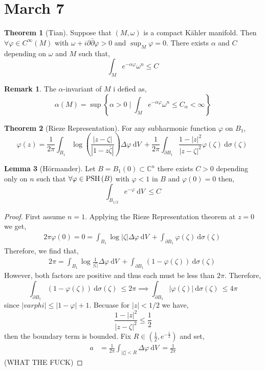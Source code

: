 \documentclass[12pt]{extarticle}
\newcommand{\C}{\mathbb{C}}
\renewcommand{\d}[1]{\: \mathrm{d}#1 \:}
\theoremstyle{definition}
\newtheorem{theorem}{Theorem}[section]
\newtheorem{lemma}[theorem]{Lemma}
\newtheorem{remark}{Remark}
\begin{document}
\section{March 7}

\begin{theorem}[Tian]
Suppose that $(M, \omega)$ is a compact K\"{a}hler manifold. Then $\forall \varphi \in C^{\infty}(M)$ with $\omega + i \partial \bar{\partial} \varphi > 0 $ and $\sup_M{\varphi} = 0$. There exists $\alpha$ and $C$ depending on $\omega$ and $M$ such that,
\[ \int_M e^{-\alpha \varphi} \omega^n \le C \]
\end{theorem}

\begin{remark}
The $\alpha$-invariant of $M$ i defied as,
\[ \alpha(M) = \sup \left\{ \alpha > 0 \mid \int_M e^{-\alpha \varphi} \omega^n \le C_\alpha < \infty \right\} \]
\end{remark}

\begin{theorem}[Rieze Representation]
For any subharmonic function $\varphi$ on $B_1$,
\[ \varphi(z) = \frac{1}{2 \pi} \int_{B_1} \log{\left( \frac{|z - \zeta|}{|1 - z \bar{\zeta}|}\right)} \Delta \varphi \d{V} + \frac{1}{2 \pi} \int_{\partial B_1} \frac{1 - |z|^2}{|z - \zeta|^2} \varphi(\zeta) \d{\sigma(\zeta)} \]
\end{theorem}

\begin{lemma}[H\"{o}rmander]
Let $B = B_1(0) \subset \C^n$ there exists $C > 0$ depending only on $n$ such that $\forall \varphi \in \mathrm{PSH}\left( B \right)$ with $\varphi < 1$ in $B$ and $\varphi(0) = 0$ then,
\[ \int_{B_{1/2}} e^{- \varphi} \d{V} \le C \]
\end{lemma}

\begin{proof}
First assume $n = 1$. Applying the Rieze Representation theorem at $z = 0$ we get,
\begin{align*}
2 \pi \varphi(0) = 0 = \int_{B_1} \log{|\zeta|} \Delta \varphi \d{V} + \int_{\partial B_1} \varphi(\zeta) \d{\sigma(\zeta)} 
\end{align*}
Therefore, we find that,
\begin{align*}
2 \pi  = \int_{B_1} \log{\frac{1}{|\zeta|}} \Delta \varphi \d{V} + \int_{\partial B_1} \left(1 - \varphi(\zeta) \right) \d{\sigma(\zeta)} 
\end{align*}
However, both factors are positive and thus each must be less than $2 \pi$. Therefore,
\[ \int_{\partial B_1} \left( 1 - \varphi(\zeta) \right) \d{\sigma(\zeta)} \le 2 \pi \implies \int_{\partial B_1} |\varphi(\zeta)| \d{\sigma(\zeta)} \le 4 \pi \]
since $|varphi| \le |1 - \varphi| + 1$. Becuase for $|z| < 1/2$ we have,
\[ \frac{1 - |z|^2}{|z - \zeta|^2} \le \frac{1}{2} \]
then the boundary term is bounded. Fix $R \in (\tfrac{1}{2}, e^{-\tfrac{1}{2}})$ and set,
\begin{align*}
a & = \frac{1}{2 \pi} \int_{|\zeta| < R} \Delta \varphi \d{V} = \frac{1}{2 \pi} 
\end{align*}
(WHAT THE FUCK)
\end{proof}
\end{document}
